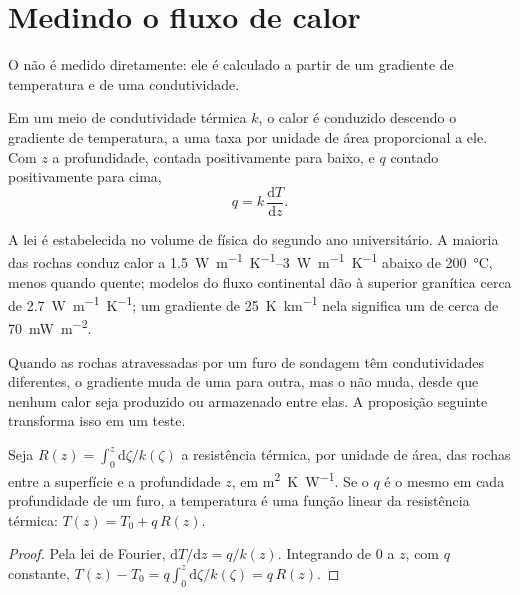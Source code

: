 \section{Medindo o fluxo de calor}

O  não é medido diretamente: ele é calculado a partir de um gradiente de temperatura
e de uma condutividade.

\begin{proposition}\label{prop:b1:heat-budget:fourier}
Em um meio de condutividade térmica $k$, o calor é conduzido descendo o
gradiente de temperatura, a uma taxa por unidade de área proporcional a ele. Com $z$ a
profundidade, contada positivamente para baixo, e $q$ contado positivamente para cima,
\[
  q = k\,\frac{\mathrm dT}{\mathrm dz} .
\]
\end{proposition}
\admitted

A lei é estabelecida no volume de física do segundo ano universitário. A maioria das
rochas conduz calor a \qtyrange{1.5}{3}{W.m^{-1}.K^{-1}} abaixo de
\qty{200}{\celsius}, menos quando quente; modelos do fluxo continental dão à
 superior granítica cerca de \qty{2.7}{W.m^{-1}.K^{-1}};
um gradiente de \qty{25}{K.km^{-1}} nela significa um  de cerca de
\qty{70}{mW.m^{-2}}.

Quando as rochas atravessadas por um furo de sondagem têm condutividades diferentes, o
gradiente muda de uma para outra, mas o  não muda, desde que
nenhum calor seja produzido ou armazenado entre elas. A proposição seguinte transforma
isso em um teste.

\begin{proposition}\label{prop:b1:heat-budget:bullard}
Seja $R(z) = \int_0^z \mathrm d\zeta/k(\zeta)$ a resistência térmica, por
unidade de área, das rochas entre a superfície e a profundidade $z$, em
\unit{m^2.K.W^{-1}}. Se o  $q$ é o mesmo em cada profundidade de um
furo, a temperatura é uma função linear da resistência térmica:
$T(z) = T_0 + q\,R(z)$.
\end{proposition}

\begin{proof}
Pela lei de Fourier, $\mathrm dT/\mathrm dz = q/k(z)$. Integrando de $0$ a
$z$, com $q$ constante, $T(z) - T_0 = q\int_0^z \mathrm d\zeta/k(\zeta) = q\,R(z)$.
\end{proof}

